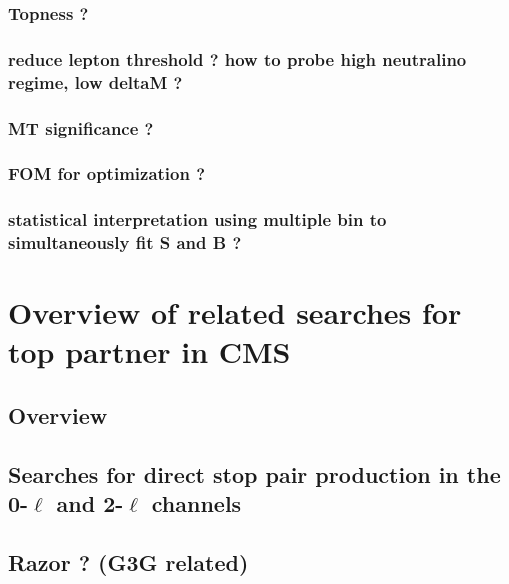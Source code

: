             \subsubsection{Topness ?}

             \subsubsection{reduce lepton threshold ? how to probe high neutralino regime, low deltaM ?}
             
             \subsubsection{MT significance ?}

             \subsubsection{FOM for optimization ?}
            
             \subsubsection{statistical interpretation using multiple bin to simultaneously fit S and B ?}
    
    \section{Overview of related searches for top partner in CMS \label{sec:analysis_overviewStopSearches}}
        
        \loremipsum

        \subsection{Overview}


        \subsection{Searches for direct stop pair production in the 0-$\ell$ and 2-$\ell$ channels}
        

        \subsection{Razor ? (G3G related)}
        
